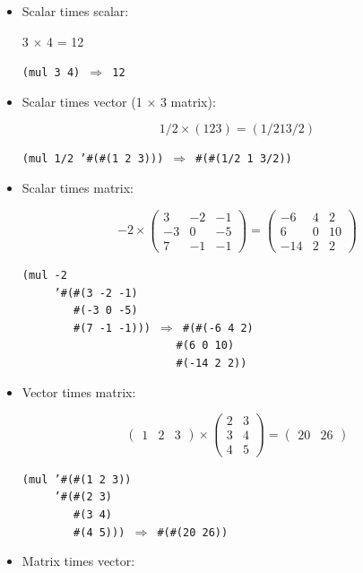 \begin{itemize}
\item 
Scalar times scalar:


3 \(\times\) 4 = 12



\texttt{(mul 3 4) \(\Rightarrow\) 12}
\item 
Scalar times vector (1 \(\times\) 3 matrix):


\[1/2 \times (1 2 3) = (1/2 1 3/2)\]



\texttt{(mul 1/2 '\#{}(\#{}(1 2 3))) \(\Rightarrow\) \#{}(\#{}(1/2 1 3/2))}
\item 
Scalar times matrix:


\[-2 \times 
\begin{pmatrix}
3 & -2 & -1 \\
-3 & 0 & -5 \\
7 & -1 & -1 
\end{pmatrix} =
\begin{pmatrix}
-6 & 4 & 2 \\
6 & 0 & 10 \\
-14 & 2 & 2
\end{pmatrix}
\]



\begin{alltt}
(mul -2
     '\#{}(\#{}(3 -2 -1)
        \#{}(-3 0 -5)
        \#{}(7 -1 -1))) \(\Rightarrow\) \#{}(\#{}(-6 4 2)
                        \#{}(6 0 10)
                        \#{}(-14 2 2))
\end{alltt}

\item 
Vector times matrix:


\[
\begin{pmatrix}
1 & 2 & 3
\end{pmatrix} \times
\begin{pmatrix}
2 & 3 \\
3 & 4 \\
4 & 5
\end{pmatrix} =
\begin{pmatrix}
20 & 26
\end{pmatrix}
\]



\begin{alltt}
(mul '\#{}(\#{}(1 2 3))
     '\#{}(\#{}(2 3)
        \#{}(3 4)
        \#{}(4 5))) \(\Rightarrow\) \#{}(\#{}(20 26))
\end{alltt}

\item 
Matrix times vector:



\end{itemize}
